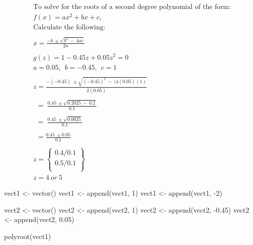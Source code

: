 \documentclass[
]{article}
\newenvironment{Shaded}{\begin{snugshade}}{\end{snugshade}}
\newcommand{\DecValTok}[1]{\textcolor[rgb]{0.00,0.00,0.81}{#1}}
\newcommand{\FloatTok}[1]{\textcolor[rgb]{0.00,0.00,0.81}{#1}}
\newcommand{\FunctionTok}[1]{\textcolor[rgb]{0.00,0.00,0.00}{#1}}
\newcommand{\NormalTok}[1]{#1}
\newcommand{\OtherTok}[1]{\textcolor[rgb]{0.56,0.35,0.01}{#1}}
\newcommand{\SpecialCharTok}[1]{\textcolor[rgb]{0.00,0.00,0.00}{#1}}
\begin{document}
\[
\begin{aligned}
&\text{To solve for the roots of a second degree polynomial of the form:} \\
& f(x) = ax^2 + bx + c,\\
& \text{Calculate the following:}\\ \\
&x = \frac{-b\ \pm \sqrt{b^2\ -\ 4ac}}{2a}\\ \\
&g(z) = 1 - 0.45z + 0.05z^2= 0\\
&a = 0.05,\ \ b = -0.45,\ \ c = 1 \\
\\
&z=\frac{-(-0.45)\ \pm \sqrt{(-0.45)^2\ -\ (4(0.05)(1)}}{2(0.05)}\\ \\
& \ \ =\ \frac{0.45\ \pm \sqrt{0.2025\ -\ 0.2}}{0.1}\\ \\
& \ \ =\ \frac{0.45\ \pm \sqrt{0.0025}}{0.1}\\ \\
& \ \ =\frac{0.45\ \pm 0.05}{0.1}\\ \\
&z = 
\left\{
    \begin{array}{lr}
        0.4/0.1 \\
        0.5/0.1\\
    \end{array}
\right\} \\
&z = 4\ or\ 5
\end{aligned}
\]

\begin{Shaded}
\begin{Highlighting}[]
\NormalTok{vect1 }\OtherTok{\textless{}{-}} \FunctionTok{vector}\NormalTok{()}
\NormalTok{vect1 }\OtherTok{\textless{}{-}} \FunctionTok{append}\NormalTok{(vect1, }\DecValTok{1}\NormalTok{)}
\NormalTok{vect1 }\OtherTok{\textless{}{-}} \FunctionTok{append}\NormalTok{(vect1, }\SpecialCharTok{{-}}\DecValTok{2}\NormalTok{)}

\NormalTok{vect2 }\OtherTok{\textless{}{-}} \FunctionTok{vector}\NormalTok{()}
\NormalTok{vect2 }\OtherTok{\textless{}{-}} \FunctionTok{append}\NormalTok{(vect2, }\DecValTok{1}\NormalTok{)}
\NormalTok{vect2 }\OtherTok{\textless{}{-}} \FunctionTok{append}\NormalTok{(vect2, }\SpecialCharTok{{-}}\FloatTok{0.45}\NormalTok{)}
\NormalTok{vect2 }\OtherTok{\textless{}{-}} \FunctionTok{append}\NormalTok{(vect2, }\FloatTok{0.05}\NormalTok{)}

\FunctionTok{polyroot}\NormalTok{(vect1)}
\end{Highlighting}
\end{Shaded}
\end{document}
